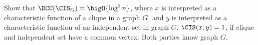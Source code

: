 Show that $\DCC(\CIS_G) = \bigO{\log^2 n}$, where $x$ is interpreted as a characteristic function of a
clique in a graph $G$, and $y$ is interpreted as a characteristic function of an independent set in graph
$G$. $\CIS(x, y) = 1$, if clique and independent set have a common vertex. Both parties know graph $G$.